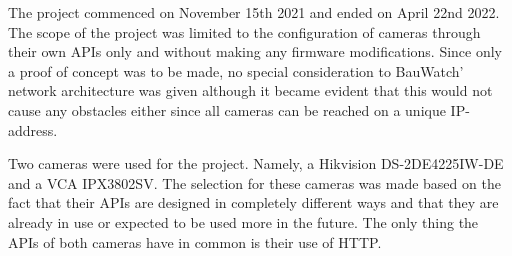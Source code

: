 
The project commenced on November 15th 2021 and ended on April 22nd 2022. The scope of the project was limited to the configuration of cameras through their own APIs only and
without making any firmware modifications. Since only a proof of concept was to be made, no special consideration to BauWatch' network architecture was given although it became
evident that this would not cause any obstacles either since all cameras can be reached on a unique IP-address.

Two cameras were used for the project. Namely, a Hikvision DS-2DE4225IW-DE and a VCA IPX3802SV.
The selection for these cameras was made based on the fact that their APIs are designed in completely different ways and that they are already in use or expected to be used more in the future.
The only thing the APIs of both cameras have in common is their use of HTTP.
